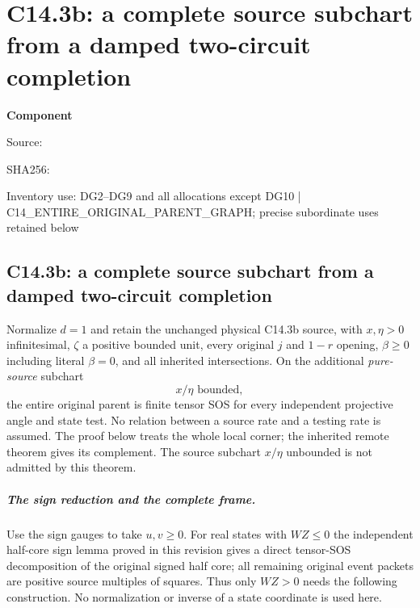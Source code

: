 \chapter{C14.3b: a complete source subchart from a damped two-circuit completion}
\label{component:p024c821bfb59}
\noindent\textbf{Component }\par
{\small\noindent Source: \par}
{\small\noindent SHA256: \par}
{\small\noindent Inventory use: DG2--DG9 and all allocations except DG10 | C14\_\allowbreak{}ENTIRE\_\allowbreak{}ORIGINAL\_\allowbreak{}PARENT\_\allowbreak{}GRAPH; precise subordinate uses retained below\par}
\medskip
\section{C14.3b: a complete source subchart from a damped two-circuit completion}

\begin{theorem}
Normalize $d=1$ and retain the unchanged physical C14.3b source, with $x,\eta>0$
infinitesimal, $\zeta$ a positive bounded unit, every original $j$
and $1-r$ opening, $\beta\ge0$ including literal $\beta=0$, and all inherited intersections.
On the additional \emph{pure-source} subchart
\[
                         x/\eta\text{ bounded},              \tag{DG1}
\]
the entire original parent is finite tensor SOS for every independent
projective angle and state test. No relation between a source rate
and a testing rate is assumed. The proof below treats the whole local
corner; the inherited remote theorem gives its complement. The source
subchart $x/\eta$ unbounded is not admitted by this theorem.
\end{theorem}

\paragraph{The sign reduction and the complete frame.}
Use the sign gauges to take $u,v\ge0$. For real states with $WZ\le0$
the independent half-core sign lemma proved in this revision gives a
direct tensor-SOS decomposition of the original signed half core;
all remaining original event packets are positive source multiples
of squares. Thus only $WZ>0$ needs the following construction. No
normalization or inverse of a state coordinate is used here.

